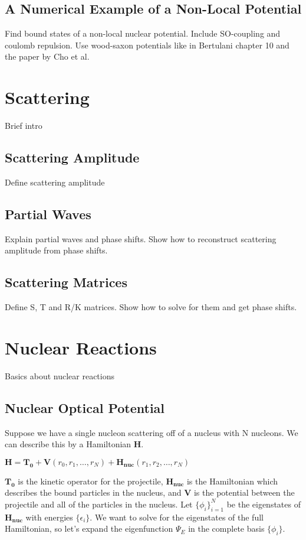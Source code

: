 \documentclass[12pt,letterpaper]{article}
\numberwithin{equation}{section}
\begin{document}
\subsection{A Numerical Example of a Non-Local Potential}
Find bound states of a non-local nuclear potential. Include SO-coupling and coulomb repulsion. Use wood-saxon potentials like in Bertulani chapter 10 and the paper by Cho et al. 

\newpage
\section{Scattering}
Brief intro

\subsection{Scattering Amplitude}
Define scattering amplitude

\subsection{Partial Waves}
Explain partial waves and phase shifts. Show how to reconstruct scattering amplitude from phase shifts.

\subsection{Scattering Matrices}
Define S, T and R/K matrices. Show how to solve for them and get phase shifts.

\newpage
\section{Nuclear Reactions}
Basics about nuclear reactions

\subsection{Nuclear Optical Potential}
Suppose we have a single nucleon scattering off of a nucleus with N nucleons. We can describe this by a Hamiltonian $\boldsymbol{H}$.

\begin{center}
$\boldsymbol{H} = \boldsymbol{T_0} + \boldsymbol{V}(r_0, r_1, \dots, r_N) + \boldsymbol{H_{nuc}}(r_1, r_2, \dots, r_N)$
\end{center}

$\boldsymbol{T_0}$ is the kinetic operator for the projectile, $\boldsymbol{H_{nuc}}$ is the Hamiltonian which describes the bound particles in the nucleus, and $\boldsymbol{V}$ is the potential between the projectile and all of the particles in the nucleus. Let $\{\phi_i\}_{i=1}^N$ be the eigenstates of $\boldsymbol{H_{nuc}}$ with energies $\{\epsilon_i\}$. We want to solve for the eigenstates of the full Hamiltonian, so let's expand the eigenfunction $\Psi_E$ in the complete basis $\{\phi_i\}$.
\end{document}
